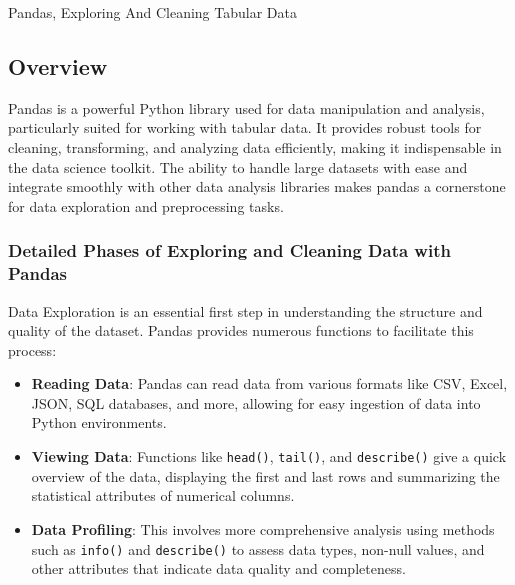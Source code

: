 \begin{notes}{Pandas, Exploring And Cleaning Tabular Data}
    \subsection*{Overview}

    Pandas is a powerful Python library used for data manipulation and analysis, particularly suited for working with tabular data. It provides robust tools for cleaning, transforming, and analyzing 
    data efficiently, making it indispensable in the data science toolkit. The ability to handle large datasets with ease and integrate smoothly with other data analysis libraries makes pandas a 
    cornerstone for data exploration and preprocessing tasks. \vspace*{1em}
    
    \subsubsection*{Detailed Phases of Exploring and Cleaning Data with Pandas}
    
    Data Exploration is an essential first step in understanding the structure and quality of the dataset. Pandas provides numerous functions to facilitate this process:
    \begin{itemize}
        \item \textbf{Reading Data}: Pandas can read data from various formats like CSV, Excel, JSON, SQL databases, and more, allowing for easy ingestion of data into Python environments.
        \item \textbf{Viewing Data}: Functions like \texttt{head()}, \texttt{tail()}, and \texttt{describe()} give a quick overview of the data, displaying the first and last rows and summarizing the 
        statistical attributes of numerical columns.
        \item \textbf{Data Profiling}: This involves more comprehensive analysis using methods such as \texttt{info()} and \texttt{describe()} to assess data types, non-null values, and other attributes 
        that indicate data quality and completeness.
    \end{itemize}
    

\end{notes}

